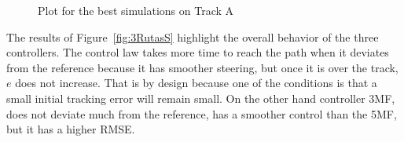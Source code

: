 \documentclass[symmetry,article,submit,moreauthors,pdftex]{Definitions/mdpi}
\begin{document}
\begin{figure}[H]
    \widefigure
     \centering
     \caption{Plot for the best simulations on Track A}
        \label{fig:3RutasA}
\end{figure}
\begin{paracol}{2}
\linenumbers
\switchcolumn


The results of Figure~\ref{fig:3RutasS} highlight the overall behavior of the
three controllers. The control law takes more time to reach the path when it
deviates from the reference because it has smoother steering, but once it is
over the track, $e$ does not increase.  That is by design because one of the
conditions is that a small initial tracking error will remain small. On the
other hand controller 3MF, does not deviate much from the reference, has a
smoother control than the 5MF, but it has a higher RMSE.

\end{paracol}
\end{document}
